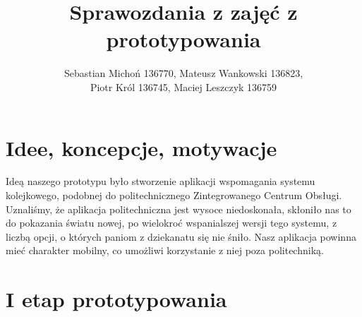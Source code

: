 \documentclass[12pt]{article}
\begin{document}
\title{Sprawozdania z zajęć z prototypowania}
\author{Sebastian Michoń 136770, Mateusz Wankowski 136823,\\ Piotr Król 136745, Maciej Leszczyk 136759}
\date{\vspace{-3ex}}
\maketitle

\section{Idee, koncepcje, motywacje}
Ideą naszego prototypu było stworzenie aplikacji wspomagania systemu kolejkowego, podobnej do politechnicznego Zintegrowanego Centrum Obsługi. Uznaliśmy, że aplikacja politechniczna jest wysoce niedoskonała, skłoniło nas to do pokazania światu nowej, po wielokroć wspanialszej wersji tego systemu, z liczbą opcji, o których paniom z dziekanatu się nie śniło. Nasz aplikacja powinna mieć charakter mobilny, co umożliwi korzystanie z niej poza politechniką.

\section{I etap prototypowania}
\end{document}
